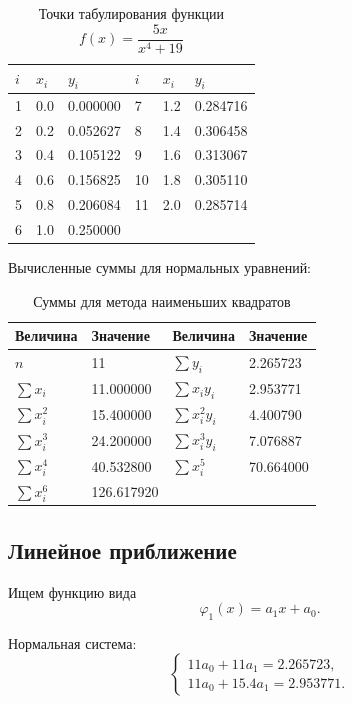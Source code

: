 \documentclass[12pt,a4paper]{article}
\begin{document}
\begin{table}[H]
  \centering
  \caption{Точки табулирования функции $f(x)=\dfrac{5x}{x^4+19}$}
  \begin{tabular}{C{1cm}C{1.7cm}C{2.4cm}C{1cm}C{1.7cm}C{2.4cm}}
    \toprule
    $i$ & $x_i$ & $y_i$ & $i$ & $x_i$ & $y_i$ \\
     & 0.0 & 0.000000 & 7 & 1.2 & 0.284716 \\
    2 & 0.2 & 0.052627 & 8 & 1.4 & 0.306458 \\
    3 & 0.4 & 0.105122 & 9 & 1.6 & 0.313067 \\
    4 & 0.6 & 0.156825 & 10 & 1.8 & 0.305110 \\
    5 & 0.8 & 0.206084 & 11 & 2.0 & 0.285714 \\
    6 & 1.0 & 0.250000 & & & \\
    \bottomrule
  \end{tabular}
\end{table}

Вычисленные суммы для нормальных уравнений:

\begin{table}[H]
  \centering
  \caption{Суммы для метода наименьших квадратов}
  \begin{tabular}{C{3.3cm}C{3.2cm}C{3.3cm}C{3.2cm}}
    \toprule
    \textbf{Величина} & \textbf{Значение} & \textbf{Величина} & \textbf{Значение} \\
    \midrule
    $n$ & 11 & $\sum y_i$ & 2.265723 \\
    $\sum x_i$ & 11.000000 & $\sum x_iy_i$ & 2.953771 \\
    $\sum x_i^2$ & 15.400000 & $\sum x_i^2y_i$ & 4.400790 \\
    $\sum x_i^3$ & 24.200000 & $\sum x_i^3y_i$ & 7.076887 \\
    $\sum x_i^4$ & 40.532800 & $\sum x_i^5$ & 70.664000 \\
    $\sum x_i^6$ & 126.617920 & & \\
    \bottomrule
  \end{tabular}
\end{table}

\subsection{Линейное приближение}

Ищем функцию вида
\[
  \varphi_1(x)=a_1x+a_0.
\]

Нормальная система:
\[
\begin{cases}
  11a_0+11a_1=2.265723,\\
  11a_0+15.4a_1=2.953771.
\end{cases}
\]
\end{document}
